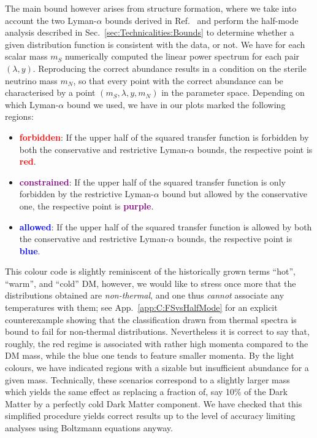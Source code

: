 The main bound however arises from structure formation, where we take into account the two Lyman-$\alpha$ bounds derived in Ref.~\cite{Markovic:2013iza} and perform the half-mode analysis described in Sec.~\ref{sec:Technicalities:Bounds} to determine whether a given distribution function is consistent with the data, or not. We have for each scalar mass $m_S$ numerically computed the linear power spectrum for each pair $(\lambda, y)$. Reproducing the correct abundance results in a condition on the sterile neutrino mass $m_N$, so that every point with the correct abundance can be characterised by a point $(m_S, \lambda, y, m_N)$ in the parameter space. Depending on which Lyman-$\alpha$ bound we used, we have in our plots marked the following regions:
\begin{itemize}

\item \textcolor{red}{\bf forbidden}: If the upper half of the squared transfer function is forbidden by both the conservative and restrictive Lyman-$\alpha$ bounds, the respective point is \textcolor{red}{\bf red}.

\item \textcolor{purple}{\bf constrained}: If the upper half of the squared transfer function is only forbidden by the restrictive Lyman-$\alpha$ bound but allowed by the conservative one, the respective point is \textcolor{purple}{\bf purple}.

\item \textcolor{blue}{\bf allowed}: If the upper half of the squared transfer function is allowed by both the conservative and restrictive Lyman-$\alpha$ bounds, the respective point is \textcolor{blue}{\bf blue}.

\end{itemize}
This colour code is slightly reminiscent of the historically grown terms ``hot'', ``warm'', and ``cold'' DM, however, we would like to stress once more that the distributions obtained are \emph{non-thermal}, and one thus \emph{cannot} associate any temperatures with them; see App.~\ref{app:C:FSvsHalfMode} for an explicit counterexample showing that the classification drawn from thermal spectra is bound to fail for non-thermal distributions. Nevertheless it is correct to say that, roughly, the red regime is associated with rather high momenta compared to the DM mass, while the blue one tends to feature smaller momenta. By the light colours, we have indicated regions with a sizable but insufficient abundance for a given mass. Technically, these scenarios correspond to a slightly larger mass which yields the same effect as replacing a fraction of, say 10\% of the Dark Matter by a perfectly cold Dark Matter component. We have checked that this simplified procedure yields correct results up to the level of accuracy limiting analyses using Boltzmann equations anyway.


